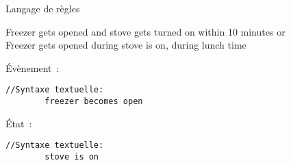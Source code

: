 \begin{frame}[fragile]{Langage de règles}
\addtocounter{framenumber}{-1}
  \begin{coloredbox}[gray]{}
    \begin{footnotesize}
      Freezer \colorbox{checked!50}{gets opened} \colorbox{black!2}{and} stove gets turned on \colorbox{black!2}{within 10 minutes} or\\ Freezer gets opened during stove \colorbox{darkgray!50}{is on}, during lunch time
    \end{footnotesize}
  \end{coloredbox}
\vfill
  \begin{minipage}{.31\linewidth}
    \begin{coloredbox}[checked]{Évènement~:}
      \begin{lstlisting}[language=MaloyaText]
        //Syntaxe textuelle:
        freezer becomes open
      \end{lstlisting}
    \end{coloredbox}
  \end{minipage}
  \hfill
  \begin{minipage}{.31\linewidth}
    \begin{coloredbox}[darkgray]{État~:}
      \begin{lstlisting}[language=MaloyaText]
        //Syntaxe textuelle:
        stove is on
      \end{lstlisting}
    \end{coloredbox}
  \end{minipage}
  \hfill
  \begin{minipage}{.33\linewidth}
    \begin{center}
    \end{center}
  \end{minipage}
\end{frame}


